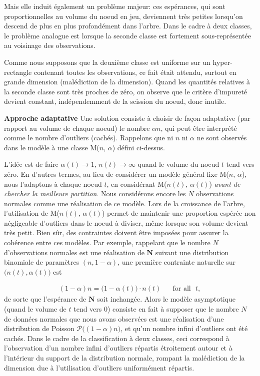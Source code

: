 \documentclass[a4paper, 12pt]{article}
\def\mb{\mathbf}
\begin{document}
Mais elle induit également un problème majeur: ces espérances, qui sont proportionnelles au volume du noeud en jeu, deviennent très petites lorsqu'on descend de plus en plus profondément dans l'arbre. Dans le cadre à deux classes, le problème analogue est lorsque la seconde classe est fortement sous-représentée au voisinage des observations.

Comme nous supposons que la deuxième classe est uniforme sur un hyper-rectangle contenant toutes les observations, ce fait était attendu, surtout en grande dimension (malédiction de la dimension). Quand les quantités relatives à la seconde classe sont très proches de zéro, on observe que le critère d'impureté devient constant, indépendemment de la scission du noeud, donc inutile.

\textbf{Approche adaptative}
%
Une solution consiste à choisir de façon adaptative (par rapport au volume de chaque noeud) le nombre $\alpha n $, qui peut être interprété comme le nombre d'outliers (cachés). Rappelons que ni $n$ ni $\alpha $ ne sont observés dans le modèle à une classe M($n$, $\alpha$) défini ci-dessus.

L'idée est de faire $\alpha(t) \to 1$, $n(t) \to \infty$ quand le volume du noeud $t$ tend vers zéro. 
En d'autres termes, au lieu de considérer un modèle général fixe M($n$, $\alpha$), nous l'adaptons à chaque noeud $t$, en considérant M($n(t)$, $\alpha(t)$) \emph{avant de chercher la meilleure partition}. Nous considérons encore les $N$ observations normales comme une réalisation de ce modèle. Lors de la croissance de l'arbre, l'utilisation de M($n(t)$, $\alpha(t)$) permet de maintenir une proportion espérée non négligeable d'outliers dans le noeud à diviser, même lorsque son volume devient très petit. Bien sûr, des contraintes doivent être imposées pour assurer la cohérence entre ces modèles. Par exemple, rappelant que le nombre $N$ d'observations normales est une réalisation de $\mb N $ suivant une distribution binomiale de paramètres $ (n, 1-\alpha) $, une première contrainte naturelle sur $\big(n(t), \alpha(t)\big)$  est

\begin{align}
\label{resume_fr:constraint1}
(1-\alpha)n = \big(1-\alpha(t)\big) \cdot n(t) \text{~~~~~for all~~} t,
\end{align}
de sorte que l'espérance de $\mb N$ soit inchangée.
Alors le modèle asymptotique (quand le volume de $t$ tend vers $0$) consiste en fait à supposer que le nombre $N$ de données normales que nous avons observées est une réalisation d'une distribution de Poisson $\mathcal{P}\big((1-\alpha)n\big)$,
et qu'un nombre infini d'outliers ont été cachés. Dans le cadre de la classification à deux classes, ceci correspond à l'observation d'un nombre infini d'outliers répartis étroitement autour et à l'intérieur du support de la distribution normale, rompant la malédiction de la dimension due à l'utilisation d'outliers uniformément répartis.
\end{document}
